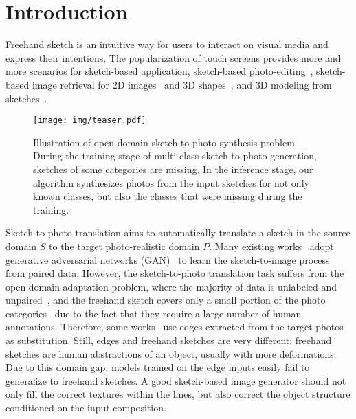 \documentclass[10pt,twocolumn,letterpaper]{article}
\begin{document}
\section{Introduction}
Freehand sketch is an intuitive way for users to interact on visual media and express their intentions. The popularization of touch screens provides more and more scenarios for sketch-based application, \eg sketch-based photo-editing~\cite{portenier2018faceshop,dekel2018sparse,jo2019sc,olszewski2020intuitive,yang2020deep}, sketch-based image retrieval for 2D images~\cite{yu2016sketch,song2017deep,liu2017deep,zhang2018generative,yelamarthi2018zero,pang2019generalising,dey2019doodle,collomosse2019livesketch,dutta2019semantically,bhunia2020sketch,liu2020scenesketcher, Bhunia_2021_CVPR_2} and 3D shapes~\cite{wang2015sketch,zhu2016learning,dai2017deep,xie2017learning,chen2018deep}, and 3D modeling from sketches~\cite{lun20173d,han2017deepsketch2face,shen2019deepsketchhair}.

\begin{figure}[t]
    \centering
    \texttt{[image: img/teaser.pdf]}
\caption{Illustration of open-domain sketch-to-photo synthesis problem. During the training stage of multi-class sketch-to-photo generation, sketches of some categories are missing. 
    In the inference stage, our algorithm synthesizes photos from the input sketches for not only known classes, but also the classes that were missing during the training. }
    \label{fig:illustration}
\end{figure}

Sketch-to-photo translation aims to automatically translate a sketch in the source domain $S$ to the target photo-realistic domain $P$. Many existing works~\cite{isola2017image,chen2018sketchygan,lu2018image,ghosh2019interactive,li2019linestofacephoto,gao2020sketchycoco,chen2020deepfacedrawing,li2020deepfacepencil} adopt generative adversarial networks (GAN)~\cite{goodfellow2014generative} to learn the sketch-to-image process from paired data. However, the sketch-to-photo translation task suffers from the open-domain adaptation problem, where the majority of data is unlabeled and unpaired~\cite{eitz2012humans,yi2014bmvc,li2017deeper,ha2017neural,zou2018sketchyscene,caesar2018coco,li2019photo}, and the freehand sketch covers only a small portion of the photo categories~\cite{sangkloy2016sketchy,yu2016sketch,song2017deep,liu2019unpaired,ghosh2019interactive} due to the fact that they require a large number of human annotations. Therefore, some works~\cite{isola2017image,li2019linestofacephoto,chen2020deepfacedrawing,li2020deepfacepencil} use edges extracted from the target photos as substitution. Still, edges and freehand sketches are very different: freehand sketches are human abstractions of an object, usually with more deformations. Due to this domain gap, models trained on the edge inputs easily fail to generalize to freehand sketches. A good sketch-based image generator should not only fill the correct textures within the lines, but also correct the object structure conditioned on the input composition. 
\end{document}
